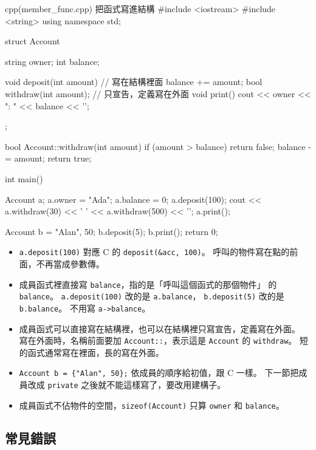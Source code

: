 \begin{example}[label=ex:member-func]{cpp}{(member\_func.cpp) 把函式寫進結構}
#include <iostream>
#include <string>
using namespace std;

struct Account {
    string owner;
    int balance;

    void deposit(int amount) {        // 寫在結構裡面
        balance += amount;
    }
    bool withdraw(int amount);        // 只宣告，定義寫在外面
    void print() {
        cout << owner << ": " << balance << '\n';
    }
};

bool Account::withdraw(int amount) {
    if (amount > balance) {
        return false;
    }
    balance -= amount;
    return true;
}

int main() {
    Account a;
    a.owner = "Ada";
    a.balance = 0;
    a.deposit(100);
    cout << a.withdraw(30) << ' ' << a.withdraw(500) << '\n';
    a.print();

    Account b = {"Alan", 50};
    b.deposit(5);
    b.print();
    return 0;
}
\end{example}


\begin{itemize}
\item \texttt{a.deposit(100)} 對應 C 的 \texttt{deposit(\&acc, 100)}。
呼叫的物件寫在點的前面，不再當成參數傳。
\item 成員函式裡直接寫 \texttt{balance}，指的是「呼叫這個函式的那個物件」
的 \texttt{balance}。 \texttt{a.deposit(100)} 改的是 \texttt{a.balance}，
\texttt{b.deposit(5)} 改的是 \texttt{b.balance}。 不用寫
\texttt{a->balance}。
\item 成員函式可以直接寫在結構裡，也可以在結構裡只寫宣告，定義寫在外面。
寫在外面時，名稱前面要加 \texttt{Account::}，表示這是 \texttt{Account}
的 \texttt{withdraw}。 短的函式通常寫在裡面，長的寫在外面。
\item \texttt{Account b = \{"Alan", 50\};} 依成員的順序給初值，跟 C 一樣。
下一節把成員改成 \texttt{private} 之後就不能這樣寫了，要改用建構子。
\item 成員函式不佔物件的空間，\texttt{sizeof(Account)} 只算 \texttt{owner}
和 \texttt{balance}。
\end{itemize}

\subsection{常見錯誤}

